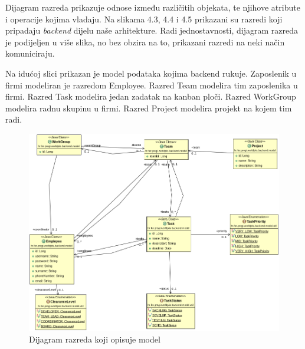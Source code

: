 			Dijagram razreda prikazuje odnose između različitih objekata, te njihove atribute i operacije kojima vladaju. Na slikama 4.3, 4.4 i 4.5 prikazani su razredi koji pripadaju \textit{backend} dijelu naše arhitekture. Radi jednostavnosti, dijagram razreda je podijeljen u više slika, no bez obzira na to, prikazani razredi na neki način komuniciraju.
 			
 			
 			
 			Na idućoj slici prikazan je model podataka kojima backend rukuje. Zaposlenik u firmi modeliran je razredom Employee. Razred Team modelira tim zaposlenika u firmi. Razred Task modelira jedan zadatak na kanban ploči. Razred WorkGroup modelira radnu skupinu u firmi. Razred Project modelira projekt na kojem tim radi.
 			
			\begin{figure}[H]
				\includegraphics[width=\textwidth]{slike/CLASSD_model.png}
				\centering
				\caption{Dijagram razreda koji opisuje model}
				\label{fig:classd_model}
			\end{figure}
			
